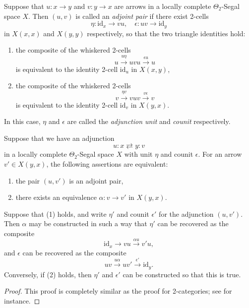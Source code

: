 \documentclass[a4paper, 11pt]{amsart}
\numberwithin{theorem}{section}
\theoremstyle{definition}
\newcommand{\id}{\mathrm{id}}
\begin{document}
\begin{definition}\label{def.adjunction}
	Suppose that $u : x \rightarrow y$ and $v: y \rightarrow x$ are arrows in a locally complete $\Theta_2$-Segal space $X$. Then $(u,v)$ is called an \textit{adjoint pair} if there 
	exist 2-cells 
	$$
	\eta : \id_x \rightarrow vu, \quad \epsilon : uv \rightarrow \id_y
	$$
	in $X(x,x)$ and $X(y,y)$ respectively, so that the two triangle identities hold:
	\begin{enumerate}
		\item the composite of the whiskered 2-cells
		$$
		u \xrightarrow{u\eta} uvu \xrightarrow{\epsilon u} u
		$$
		is equivalent to the identity 2-cell $\id_u$ in $X(x,y)$,
		\item the composite of the whiskered 2-cells
		$$
		v \xrightarrow{\eta v} vuv \xrightarrow{v\epsilon} v
		$$
		is equivalent to the identity 2-cell $\id_v$ in $X(y,x)$.
	\end{enumerate}
	In this case, $\eta$ and $\epsilon$ are called the \textit{adjunction unit} and \textit{counit} respectively.
\end{definition}

\begin{proposition}\label{prop.uniqueness-adjoints}
	Suppose that we have an adjunction
	\[
		u : x \rightleftarrows y : v
	\]
	in a locally complete $\Theta_2$-Segal space $X$ with unit $\eta$ and counit $\epsilon$.  For an arrow $v' \in X(y,x)$, the following assertions 
	are equivalent:
	\begin{enumerate}
		\item the pair $(u,v')$ is an adjoint pair,
		\item there exists an equivalence  $\alpha : v \rightarrow v'$ in $X(y,x)$.
	\end{enumerate} 
	Suppose that (1) holds, and write $\eta'$ and counit $\epsilon'$ for the adjunction $(u,v')$. Then $\alpha$ may be 
	constructed in such a way that
	$\eta'$ can be recovered as the composite 
	$$
	\id_x \rightarrow vu \xrightarrow{\alpha u} v'u,
	$$
	and $\epsilon$ can be recovered as the composite 
	$$
	uv \xrightarrow{u\alpha} uv' \xrightarrow{\epsilon'} \id_y.
	$$
	Conversely, if (2) holds, then $\eta'$ and $\epsilon'$ can be constructed so that this is true.
\end{proposition}
\begin{proof}
	This proof is completely similar as the proof for 2-categories; see \cite[Proposition 2.1.10]{RiehlVerity} for instance.  
\end{proof}
\end{document}
